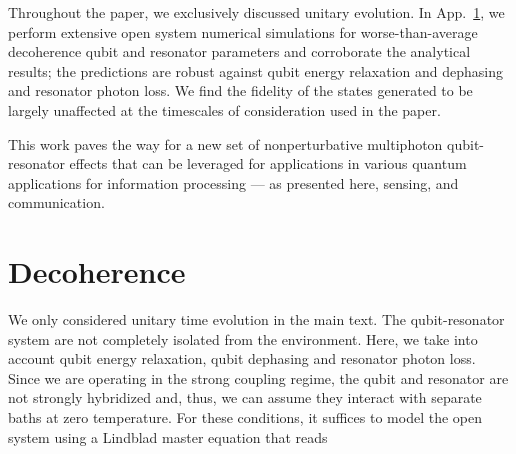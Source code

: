 Throughout the paper, we exclusively discussed unitary evolution. In App.~\ref{app:decoherence}, we perform extensive open system numerical simulations for worse-than-average decoherence qubit and resonator parameters and corroborate the analytical results; the predictions are robust against qubit energy relaxation and dephasing and resonator photon loss. We find the fidelity of the states generated to be largely unaffected at the timescales of consideration used in the paper.

This work paves the way for a new set of nonperturbative multiphoton qubit-resonator effects that can be leveraged for applications in various quantum applications for information processing --- as presented here, sensing, and communication.


\section{Decoherence}\label{app:decoherence}
We only considered unitary time evolution in the main text. The qubit-resonator system are not completely isolated from the environment. Here, we take into account qubit energy relaxation, qubit dephasing and resonator photon loss. Since we are operating in the strong coupling regime, the qubit and resonator are not strongly hybridized and, thus, we can assume they interact with separate baths at zero temperature. For these conditions, it suffices to model the open system using a Lindblad master equation that reads  \cite{Breuer_Petruccione_2010,Carmichael_1993}
